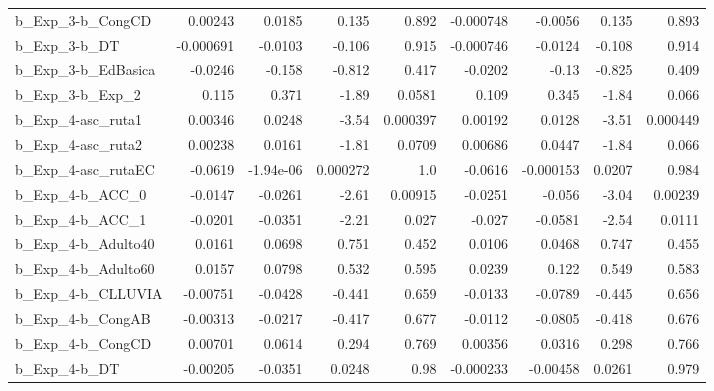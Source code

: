 \begin{tabular}{lrrrrrrrr}
b\_Exp\_3-b\_CongCD           &     0.00243 &       0.0185 &     0.135 &    0.892 &  -0.000748 &     -0.0056 &        0.135 &         0.893 \\
b\_Exp\_3-b\_DT               &   -0.000691 &      -0.0103 &    -0.106 &    0.915 &  -0.000746 &     -0.0124 &       -0.108 &         0.914 \\
b\_Exp\_3-b\_EdBasica         &     -0.0246 &       -0.158 &    -0.812 &    0.417 &    -0.0202 &       -0.13 &       -0.825 &         0.409 \\
b\_Exp\_3-b\_Exp\_2            &       0.115 &        0.371 &     -1.89 &   0.0581 &      0.109 &       0.345 &        -1.84 &         0.066 \\
b\_Exp\_4-asc\_ruta1          &     0.00346 &       0.0248 &     -3.54 & 0.000397 &    0.00192 &      0.0128 &        -3.51 &      0.000449 \\
b\_Exp\_4-asc\_ruta2          &     0.00238 &       0.0161 &     -1.81 &   0.0709 &    0.00686 &      0.0447 &        -1.84 &         0.066 \\
b\_Exp\_4-asc\_rutaEC         &     -0.0619 &    -1.94e-06 &  0.000272 &      1.0 &    -0.0616 &   -0.000153 &       0.0207 &         0.984 \\
b\_Exp\_4-b\_ACC\_0            &     -0.0147 &      -0.0261 &     -2.61 &  0.00915 &    -0.0251 &      -0.056 &        -3.04 &       0.00239 \\
b\_Exp\_4-b\_ACC\_1            &     -0.0201 &      -0.0351 &     -2.21 &    0.027 &     -0.027 &     -0.0581 &        -2.54 &        0.0111 \\
b\_Exp\_4-b\_Adulto40         &      0.0161 &       0.0698 &     0.751 &    0.452 &     0.0106 &      0.0468 &        0.747 &         0.455 \\
b\_Exp\_4-b\_Adulto60         &      0.0157 &       0.0798 &     0.532 &    0.595 &     0.0239 &       0.122 &        0.549 &         0.583 \\
b\_Exp\_4-b\_CLLUVIA          &    -0.00751 &      -0.0428 &    -0.441 &    0.659 &    -0.0133 &     -0.0789 &       -0.445 &         0.656 \\
b\_Exp\_4-b\_CongAB           &    -0.00313 &      -0.0217 &    -0.417 &    0.677 &    -0.0112 &     -0.0805 &       -0.418 &         0.676 \\
b\_Exp\_4-b\_CongCD           &     0.00701 &       0.0614 &     0.294 &    0.769 &    0.00356 &      0.0316 &        0.298 &         0.766 \\
b\_Exp\_4-b\_DT               &    -0.00205 &      -0.0351 &    0.0248 &     0.98 &  -0.000233 &    -0.00458 &       0.0261 &         0.979 \\

\end{tabular}

